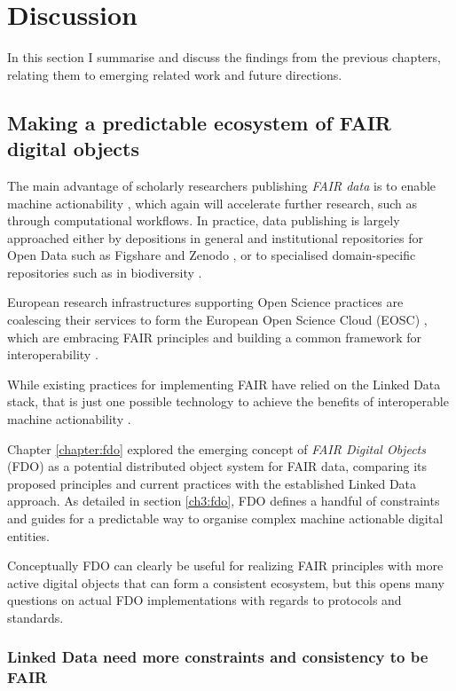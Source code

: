 \section{Discussion}
\label{ch61:discuss}

In this section I summarise and discuss the findings from the previous chapters, relating them to emerging related work and future directions.

\subsection{Making a predictable ecosystem of FAIR digital objects}
\label{ch61:ecosystem}

The main advantage of scholarly researchers publishing \emph{FAIR data} is to enable machine actionability \cite{Wilkinson 2016}, which again will accelerate further research, such as through computational workflows. 
In practice, data publishing is largely approached either by depositions in general and institutional repositories for Open Data such as Figshare and Zenodo \cite{Dillen 2019a}, or to specialised domain-specific repositories such as in biodiversity \cite{GBIF 2021}. 

European research infrastructures supporting Open Science practices are coalescing their services to form the European Open Science Cloud (EOSC) \cite{Ayris 2016}, which are embracing FAIR principles \cite{Mons 2017} and building a common framework for interoperability \cite{Kurowski 2021}. 

While existing practices for implementing FAIR have relied on the Linked Data stack, that is just one possible technology to achieve the benefits of interoperable machine actionability \cite{Mons 2017}. 

Chapter \ref{chapter:fdo} explored the emerging concept of \emph{FAIR Digital Objects} (FDO) \cite{Schultes 2019} as a potential distributed object system for FAIR data, comparing its proposed principles and current practices with the established Linked Data approach. 
As detailed in section \vref{ch3:fdo}, FDO defines a handful of constraints and guides for a predictable way to organise complex machine actionable digital entities. 

Conceptually FDO can clearly be useful for realizing FAIR principles with more active digital objects that can form a consistent ecosystem, but this opens many questions on actual FDO implementations with regards to protocols and standards.

\subsubsection{Linked Data need more constraints and consistency to be FAIR}
\label{ch61:constraints}

